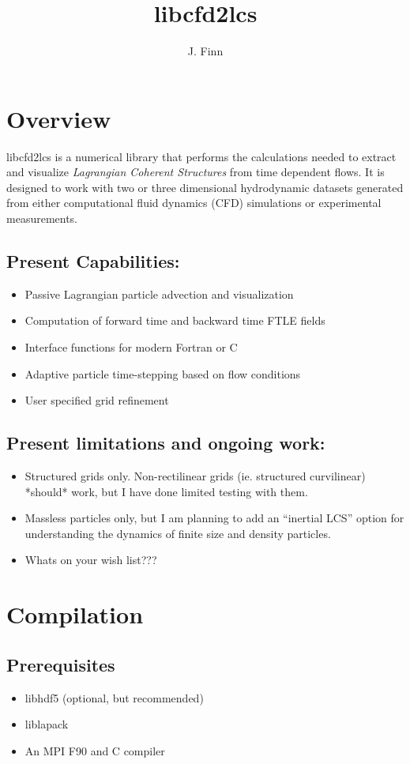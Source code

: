 \documentclass[a4paper,12pt]{article}
\title{libcfd2lcs}
\author{J. Finn}
\begin{document}
\maketitle
\section{Overview}
libcfd2lcs is a numerical library that performs the calculations needed to extract and visualize \emph{Lagrangian Coherent Structures} from time dependent flows.  It is designed to work with two or three dimensional hydrodynamic datasets generated from either computational fluid dynamics (CFD) simulations or experimental measurements.
\subsection*{Present Capabilities:}
\begin{itemize}
 \item Passive Lagrangian particle advection and visualization
 \item Computation of forward time and backward time FTLE fields
 \item Interface functions for modern Fortran or C
 \item Adaptive particle time-stepping based on flow conditions
 \item User specified grid refinement  
\end{itemize}
\subsection*{Present limitations and ongoing work:}
\begin{itemize}
 \item Structured grids only.  Non-rectilinear grids (ie. structured curvilinear) *should* work, but I have done limited testing with them.  
 \item Massless particles only, but I am planning to add an ``inertial LCS'' option for understanding the dynamics of finite size and density particles.
 \item Whats on your wish list???
\end{itemize}

\section{Compilation}
\subsection*{Prerequisites}
\begin{itemize}
 \item libhdf5 (optional, but recommended)
 \item liblapack
 \item An MPI F90 and C compiler
\end{itemize}
\end{document}
